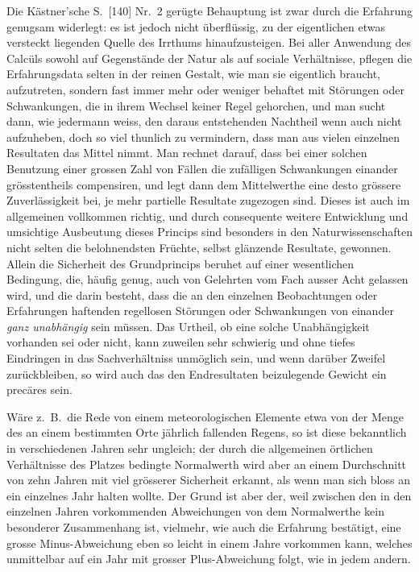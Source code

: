 \documentclass[12pt,a4paper]{article}
\begin{document}
Die K\"astner'sche S.\ [140] Nr.\ 2 ger\"ugte Behauptung ist zwar durch die Erfahrung genugsam widerlegt: es ist jedoch nicht \"uberfl\"ussig, zu der eigentlichen etwas versteckt liegenden Quelle des Irrthums hinaufzusteigen. Bei aller Anwendung des Calc\"uls sowohl auf Gegenst\"ande der Natur als auf sociale Verh\"altnisse, pflegen die Erfahrungsdata selten in der reinen Gestalt, wie man sie eigentlich braucht, aufzutreten, sondern fast immer mehr oder weniger behaftet mit St\"orungen oder Schwankungen, die in ihrem Wechsel keiner Regel gehorchen, und man sucht dann, wie jedermann weiss, den daraus entstehenden Nachtheil wenn auch nicht aufzuheben, doch so viel thunlich zu vermindern, dass man aus vielen einzelnen Resultaten das Mittel nimmt. Man rechnet darauf, dass bei einer solchen Benutzung einer grossen Zahl von F\"allen die zuf\"alligen Schwankungen einander gr\"osstentheils compensiren, und legt dann dem Mittelwerthe eine desto gr\"ossere Zuverl\"assigkeit bei, je mehr partielle Resultate zugezogen sind. Dieses ist auch im allgemeinen vollkommen richtig, und durch consequente weitere Entwicklung und umsichtige Ausbeutung dieses Princips sind besonders in den Naturwissenschaften nicht selten die belohnendsten Fr\"uchte, selbst gl\"anzende Resultate, gewonnen. Allein die Sicherheit des Grundprincips beruhet auf einer wesentlichen Bedingung, die, h\"aufig genug, auch von Gelehrten vom Fach ausser Acht gelassen wird, und die darin besteht, dass die an den einzelnen Beobachtungen oder Erfahrungen haftenden regellosen St\"orungen oder Schwankungen von einander \textit{ganz unabh\"angig} sein m\"ussen. Das Urtheil, ob eine solche Unabh\"angigkeit vorhanden sei oder nicht, kann zuweilen sehr schwierig und ohne tiefes Eindringen in das Sachverh\"altniss unm\"oglich sein, und wenn dar\"uber Zweifel zur\"uckbleiben, so wird auch das den Endresultaten beizulegende Gewicht ein prec\"ares sein.

W\"are z.\ B.\ die Rede von einem meteorologischen Elemente etwa von der Menge des an einem bestimmten Orte j\"ahrlich fallenden Regens, so ist diese bekanntlich in verschiedenen Jahren sehr ungleich; der durch die allgemeinen \"ortlichen Verh\"altnisse des Platzes bedingte Normalwerth wird aber an einem Durchschnitt von zehn Jahren mit viel gr\"osserer Sicherheit erkannt, als wenn man sich bloss an ein einzelnes Jahr halten wollte. Der Grund ist aber der, weil zwischen den in den einzelnen Jahren vorkommenden Abweichungen von dem Normalwerthe kein besonderer Zusammenhang ist, vielmehr, wie auch die Erfahrung best\"atigt, eine grosse Minus-Abweichung eben so leicht in einem Jahre vorkommen kann, welches unmittelbar auf ein Jahr mit grosser Plus-Abweichung folgt, wie in jedem andern.
\end{document}
